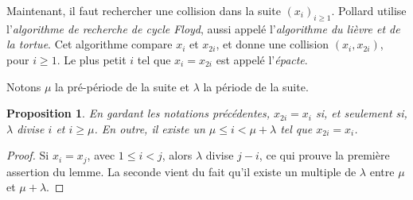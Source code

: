 \documentclass[a4paper, titlepage]{article}
\newtheorem{prop}[theo]{Proposition}
\theoremstyle{definition}
\theoremstyle{remark}
\begin{document}
Maintenant, il faut rechercher une collision dans la suite ${(x_i)}_{i\geqslant 1}$. Pollard utilise l'\textit{algorithme de recherche de cycle Floyd}, aussi appelé l'\textit{algorithme du lièvre et de la tortue}. Cet algorithme compare $x_i$ et $x_{2i}$, et donne une collision $(x_i, x_{2i})$, pour $i \geqslant 1$. Le plus petit $i$ tel que $x_i = x_{2i}$ est appelé l'\textit{épacte}. 

Notons $\mu$ la pré-période de la suite et $\lambda$ la période de la suite.

\begin{prop}\label{propFloyd}
En gardant les notations précédentes, $x_{2i} = x_i$ si, et seulement si, $\lambda$ divise $i$ et $i \geqslant \mu$. En outre, il existe un $\mu \leqslant i < \mu + \lambda$ tel que $x_{2i} = x_i$.
\end{prop}

\begin{proof}
Si $x_i = x_j$, avec $1\leqslant i < j$, alors $\lambda$ divise $j-i$, ce qui prouve la première assertion du lemme. La seconde vient du fait qu'il existe un multiple de $\lambda$ entre $\mu$ et $\mu + \lambda$.
\end{proof}
\end{document}
